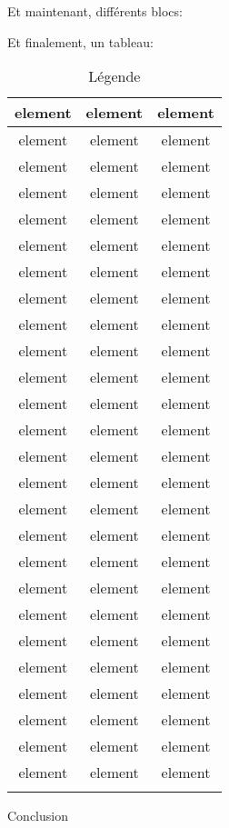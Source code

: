 \documentclass[small]{zmdocument}
\begin{document}
Et maintenant, différents blocs:

\begin{Information}
\blindtext
\begin{Question}
\blindtext
\end{Question}
\end{Information}

\begin{Question}
\blindtext
\end{Question}

\begin{Warning}
\blindtext
\end{Warning}

\begin{Error}
\blindtext
\end{Error}

Et finalement, un tableau:

\begin{longtabu}{|c|c|c|} \hline
element & element & element\\ \hline
element & element & element\\ \hline
element & element & element\\ \hline
element & element & element\\ \hline
element & element & element\\ \hline
element & element & element\\ \hline
element & element & element\\ \hline
element & element & element\\ \hline
element & element & element\\ \hline
element & element & element\\ \hline
element & element & element\\ \hline
element & element & element\\ \hline
element & element & element\\ \hline
element & element & element\\ \hline
element & element & element\\ \hline
element & element & element\\ \hline
element & element & element\\ \hline
element & element & element\\ \hline
element & element & element\\ \hline
element & element & element\\ \hline
element & element & element\\ \hline
element & element & element\\ \hline
element & element & element\\ \hline
element & element & element\\ \hline
element & element & element\\ \hline
element & element & element\\ \hline
\caption{Légende}
\end{longtabu}

\levelOneConclusion


Conclusion
\end{document}
